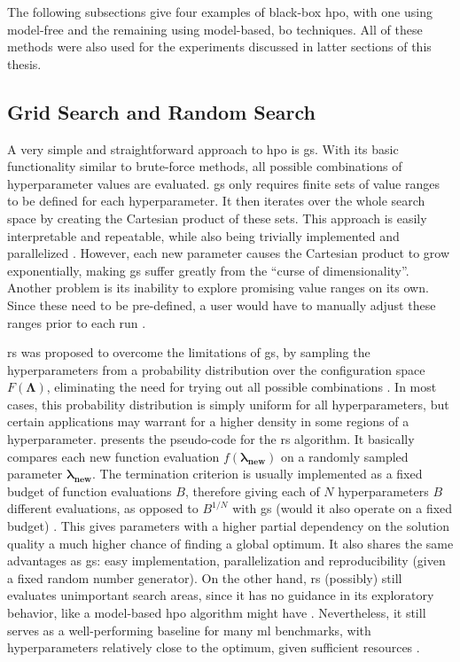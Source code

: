 The following subsections give four examples of black-box \gls{hpo}, with one using model-free and the remaining using model-based, \gls{bo} techniques. All of these methods were also used for the experiments discussed in latter sections of this thesis.

\subsection{Grid Search and Random Search}

A very simple and straightforward approach to \gls{hpo} is \gls{gs}. With its basic functionality similar to brute-force methods, all possible combinations of hyperparameter values are evaluated. \gls{gs} only requires finite sets of value ranges to be defined for each hyperparameter. It then iterates over the whole search space by creating the Cartesian product of these sets. This approach is easily interpretable and repeatable, while also being trivially implemented and parallelized \cite{bergstra2012random}. However, each new parameter causes the Cartesian product to grow exponentially, making \gls{gs} suffer greatly from the \enquote{curse of dimensionality}. Another problem is its inability to explore promising value ranges on its own. Since these need to be pre-defined, a user would have to manually adjust these ranges prior to each run \cite{yang2020hyperparameter}.

\gls{rs} was proposed to overcome the limitations of \gls{gs}, by sampling the hyperparameters from a probability distribution over the configuration space $F(\mathbf{\Lambda})$, eliminating the need for trying out all possible combinations \cite{bergstra2012random}. In most cases, this probability distribution is simply uniform for all hyperparameters, but certain applications may warrant for a higher density in some regions of a hyperparameter.  presents the pseudo-code for the \gls{rs} algorithm. It basically compares each new function evaluation $f(\mathbf{\lambda_{\text{new}}})$ on a randomly sampled parameter $\mathbf{\lambda_{\text{new}}}$. The termination criterion is usually implemented as a fixed budget of function evaluations $B$, therefore giving each of $N$ hyperparameters $B$ different evaluations, as opposed to $B^{1/N}$ with \gls{gs} (would it also operate on a fixed budget) \cite{bergstra2012random}. This gives parameters with a higher partial dependency on the solution quality a much higher chance of finding a global optimum. It also shares the same advantages as \gls{gs}: easy implementation, parallelization and reproducibility (given a fixed random number generator). On the other hand, \gls{rs} (possibly) still evaluates unimportant search areas, since it has no guidance in its exploratory behavior, like a model-based \gls{hpo} algorithm might have \cite{yang2020hyperparameter}.
Nevertheless, it still serves as a well-performing baseline for many \gls{ml} benchmarks, with hyperparameters relatively close to the optimum, given sufficient resources \cite{feurer2019hyperparameter}.

